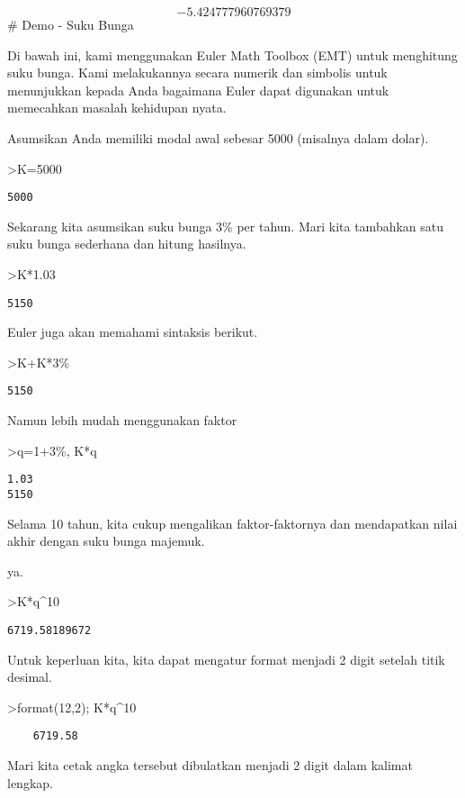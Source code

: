 \documentclass[
]{book}
\begin{document}
\[-5.424777960769379\]\# Demo - Suku Bunga

Di bawah ini, kami menggunakan Euler Math Toolbox (EMT) untuk menghitung suku bunga. Kami melakukannya secara numerik dan simbolis untuk menunjukkan kepada Anda bagaimana Euler dapat digunakan untuk memecahkan masalah kehidupan nyata.

Asumsikan Anda memiliki modal awal sebesar 5000 (misalnya dalam dolar).

\textgreater K=5000

\begin{verbatim}
5000
\end{verbatim}

Sekarang kita asumsikan suku bunga 3\% per tahun. Mari kita tambahkan satu suku bunga sederhana dan hitung hasilnya.

\textgreater K*1.03

\begin{verbatim}
5150
\end{verbatim}

Euler juga akan memahami sintaksis berikut.

\textgreater K+K*3\%

\begin{verbatim}
5150
\end{verbatim}

Namun lebih mudah menggunakan faktor

\textgreater q=1+3\%, K*q

\begin{verbatim}
1.03
5150
\end{verbatim}

Selama 10 tahun, kita cukup mengalikan faktor-faktornya dan mendapatkan nilai akhir dengan suku bunga majemuk.

ya.

\textgreater K*q\^{}10

\begin{verbatim}
6719.58189672
\end{verbatim}

Untuk keperluan kita, kita dapat mengatur format menjadi 2 digit setelah titik desimal.

\textgreater format(12,2); K*q\^{}10

\begin{verbatim}
    6719.58 
\end{verbatim}

Mari kita cetak angka tersebut dibulatkan menjadi 2 digit dalam kalimat lengkap.
\end{document}
